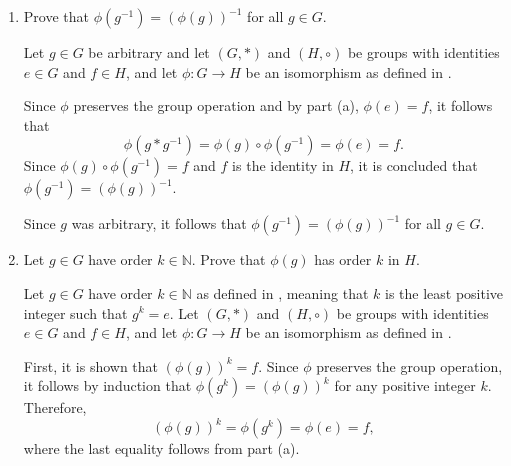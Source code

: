 \begin{enumerate}
\begin{enumerate}
\begin{subprove}
      Since $\phi$ is an isomorphism, it preserves the group operation, i.e., 
      $\phi(a * b) = \phi(a) \circ \phi(b)$ for all $a, b \in G$.
      
      For any $g \in G$, it is observed that $e * g = g$.
      Applying $\phi$ to both sides and using the property that $\phi$ preserves the group operation,
      \[
        \phi(e * g) = \phi(e) \circ \phi(g) = \phi(g).
      \]
      Since $\phi(g) \in H$ and $f$ is the identity in $H$, it follows that
      \[
        \phi(e) \circ \phi(g) = \phi(g) = f \circ \phi(g).
      \]
      By the cancellation property in $H$, it is concluded that $\phi(e) = f$.
    \end{subprove}
    \item Prove that $\phi\left(g^{-1}\right)=(\phi(g))^{-1}$ for all $g \in G$.
    \begin{subprove}
      Let $g \in G$ be arbitrary and let $(G, *)$ and $(H, \circ)$ be groups with identities $e \in G$ and $f \in H$, 
      and let $\phi: G \to H$ be an isomorphism as defined in .
      
      Since $\phi$ preserves the group operation and by part (a), $\phi(e) = f$,
      it follows that
      \[
        \phi(g * g^{-1}) = \phi(g) \circ \phi(g^{-1}) = \phi(e) = f.
      \]
      Since $\phi(g) \circ \phi(g^{-1}) = f$ and $f$ is the identity in $H$,
      it is concluded that $\phi(g^{-1}) = (\phi(g))^{-1}$.
      
      Since $g$ was arbitrary, it follows that $\phi(g^{-1}) = (\phi(g))^{-1}$ for all $g \in G$.
    \end{subprove}
    \item Let $g \in G$ have order $k \in \mathbb{N}$. Prove that $\phi(g)$ has order $k$ in $H$.
    \begin{subprove}
      Let $g \in G$ have order $k \in \mathbb{N}$ as defined in , 
      meaning that $k$ is the least positive integer such that $g^k = e$.
      Let $(G, *)$ and $(H, \circ)$ be groups with identities $e \in G$ and $f \in H$, 
      and let $\phi: G \to H$ be an isomorphism as defined in .
      
      First, it is shown that $(\phi(g))^k = f$.
      Since $\phi$ preserves the group operation, it follows by induction that 
      $\phi(g^k) = (\phi(g))^k$ for any positive integer $k$.
      Therefore,
      \[
        (\phi(g))^k = \phi(g^k) = \phi(e) = f,
      \]
      where the last equality follows from part (a).
      

\end{subprove}
\end{enumerate}
\end{enumerate}
